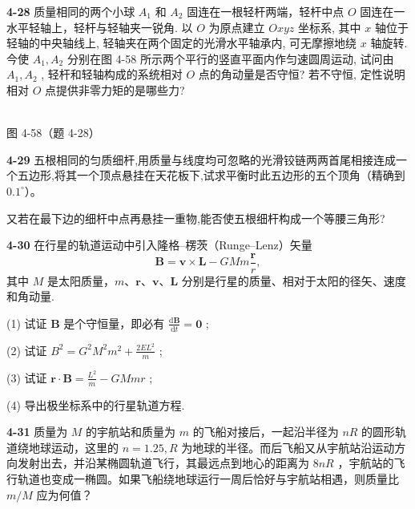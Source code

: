 \newpage

\textbf{4-28} 质量相同的两个小球 $A_{1}$ 和 $A_{2}$ 固连在一根轻杆两端，轻杆中点 $O$ 固连在一水平轻轴上，轻杆与轻轴夹一锐角. 以 $O$ 为原点建立 $Oxyz$ 坐标系, 其中 $x$ 轴位于轻轴的中央轴线上, 轻轴夹在两个固定的光滑水平轴承内, 可无摩擦地绕 $x$ 轴旋转. 今使 $A_{1}, A_{2}$ 分别在图 4-58 所示两个平行的竖直平面内作匀速圆周运动, 试问由 $A_{1}, A_{2}$ , 轻杆和轻轴构成的系统相对 $O$ 点的角动量是否守恒? 若不守恒, 定性说明相对 $O$ 点提供非零力矩的是哪些力?

\begin{center}
\resizebox{0.50\textwidth}{!}{}\\[4pt]
{\small 图 4-58（题 4-28）}
\end{center}

\newpage

\textbf{4-29} 五根相同的匀质细杆,用质量与线度均可忽略的光滑铰链两两首尾相接连成一个五边形,将其一个顶点悬挂在天花板下,试求平衡时此五边形的五个顶角（精确到 $0.1^\circ$）。

又若在最下边的细杆中点再悬挂一重物,能否使五根细杆构成一个等腰三角形?

\newpage

\textbf{4-30} 在行星的轨道运动中引入隆格–楞茨（Runge–Lenz）矢量
\[
\boldsymbol {B} = \boldsymbol {v} \times \boldsymbol {L} - G M m \frac {\boldsymbol {r}}{r},
\]
其中 $M$ 是太阳质量，$m$、$\boldsymbol r$、$\boldsymbol v$、$\boldsymbol L$ 分别是行星的质量、相对于太阳的径矢、速度和角动量.

(1) 试证 $\boldsymbol B$ 是个守恒量，即必有 $\frac{\mathrm{d}\boldsymbol B}{\mathrm{d}t}=\boldsymbol 0$ ;

(2) 试证 $B^{2} = G^{2}M^{2}m^{2} + \frac{2EL^{2}}{m}$ ;

(3) 试证 $\boldsymbol r \cdot \boldsymbol B = \frac{L^{2}}{m} - GMmr$ ;

(4) 导出极坐标系中的行星轨道方程.

\newpage

\textbf{4-31} 质量为 $M$ 的宇航站和质量为 $m$ 的飞船对接后，一起沿半径为 $nR$ 的圆形轨道绕地球运动，这里的 $n = 1.25, R$ 为地球的半径。而后飞船又从宇航站沿运动方向发射出去，并沿某椭圆轨道飞行，其最远点到地心的距离为 $8nR$ ，宇航站的飞行轨道也变成一椭圆。如果飞船绕地球运行一周后恰好与宇航站相遇，则质量比 $m / M$ 应为何值？

\newpage

